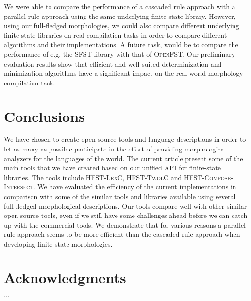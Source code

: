 \documentclass[a4paper]{article}
\begin{document}
We were able to compare the performance of a cascaded rule approach
with a parallel rule approach using the same underlying finite-state
library. However, using our full-fledged morphologies, we could also
compare different underlying finite-state libraries on real
compilation tasks in order to compare different algorithms and their
implementations. A future task, would be to compare the performance of
e.g. the \textsc{SFST} library with that of \textsc{OpenFST}.  Our
preliminary evaluation results show that efficient and well-suited
determinization and minimization algorithms have a significant impact
on the real-world morphology compilation task.

\section{Conclusions}

We have chosen to create open-source tools and language descriptions
in order to let as many as possible participate in the effort of
providing morphological analyzers for the languages of the world. The
current article present some of the main tools that we have created
based on our unified API for finite-state libraries. The tools include
\textsc{HFST-LexC}, \textsc{HFST-TwolC} and
\textsc{HFST-Compose-Intersect}. We have evaluated the efficiency of
the current implementations in comparison with some of the similar
tools and libraries available using several full-fledged morphological
descriptions. Our tools compare well with other similar open source
tools, even if we still have some challenges ahead before we can catch
up with the commercial tools. We demonstrate that for various reasons
a parallel rule approach seems to be more efficient than the cascaded
rule approach when developing finite-state morphologies.

\section*{Acknowledgments}

$\ldots$
\end{document}
